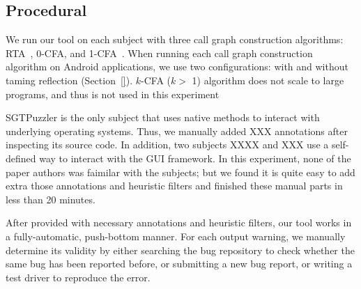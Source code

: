 \subsection{Procedural}
\label{sec:procedural}

We run our tool on each subject with three call graph construction
algorithms: RTA~\cite{}, 0-CFA, and 1-CFA~\cite{}.  When running
each call graph construction algorithm on Android applications, we
use two configurations: with and without taming reflection (Section~\ref{}).
$k$-CFA ($k >$ 1) algorithm
does not scale to large programs, and thus is not used in this experiment

SGTPuzzler is the only subject that uses native methods to interact with
underlying operating systems. Thus, we manually added XXX 
annotations after inspecting its source code. In addition, two subjects XXXX and XXX use a self-defined
way to interact with the GUI framework. In this experiment, none of the paper
authors was faimilar with the subjects; but we found it is quite easy
to add extra those annotations and heuristic filters and finished these
manual parts in less than 20 minutes.

After provided with necessary annotations and heuristic filters,
our tool works in a fully-automatic, push-bottom manner. For each output
warning, we manually determine its validity by either searching the
bug repository to check whether the same bug has been reported before,
or submitting a new bug report, or writing a test driver to reproduce
the error.




